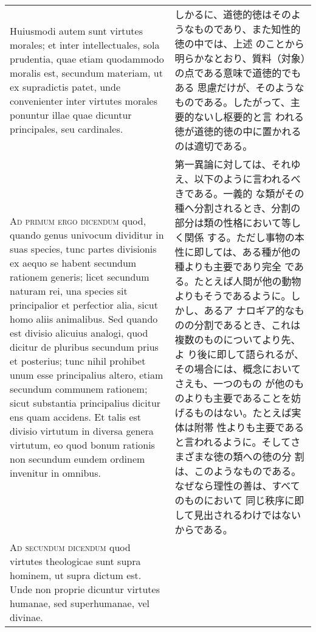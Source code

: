 \documentclass[10pt]{jsarticle}
\begin{document}
\begin{longtable}{p{21em}p{21em}}
 \\

 Huiusmodi
 autem sunt virtutes morales; et inter intellectuales, sola prudentia,
 quae etiam quodammodo moralis est, secundum materiam, ut ex
 supradictis patet, unde convenienter inter virtutes morales ponuntur
 illae quae dicuntur principales, seu cardinales.

 &

 しかるに、道徳的徳はそのようなものであり、また知性的徳の中では、上述
 のことから明らかなとおり、質料（対象）の点である意味で道徳的でもある
 思慮だけが、そのようなものである。したがって、主要的ないし枢要的と言
 われる徳が道徳的徳の中に置かれるのは適切である。

 
\\



{\scshape Ad primum ergo dicendum} quod, quando genus univocum
dividitur in suas species, tunc partes divisionis ex aequo se habent
secundum rationem generis; licet secundum naturam rei, una species sit
principalior et perfectior alia, sicut homo aliis animalibus. Sed
quando est divisio alicuius analogi, quod dicitur de pluribus secundum
prius et posterius; tunc nihil prohibet unum esse principalius altero,
etiam secundum communem rationem; sicut substantia principalius
dicitur ens quam accidens. Et talis est divisio virtutum in diversa
genera virtutum, eo quod bonum rationis non secundum eundem ordinem
invenitur in omnibus.


&

 第一異論に対しては、それゆえ、以下のように言われるべきである。一義的
 な類がその種へ分割されるとき、分割の部分は類の性格において等しく関係
 する。ただし事物の本性に即しては、ある種が他の種よりも主要であり完全
 である。たとえば人間が他の動物よりもそうであるように。しかし、あるア
 ナロギア的なものの分割であるとき、これは複数のものについてより先、よ
 り後に即して語られるが、その場合には、概念においてさえも、一つのもの
 が他のものよりも主要であることを妨げるものはない。たとえば実体は附帯
 性よりも主要であると言われるように。そしてさまざまな徳の類への徳の分
 割は、このようなものである。なぜなら理性の善は、すべてのものにおいて
 同じ秩序に即して見出されるわけではないからである。
 
\\



{\scshape Ad secundum dicendum} quod virtutes theologicae sunt supra
hominem, ut supra dictum est. Unde non proprie dicuntur virtutes
humanae, sed superhumanae, vel divinae.


\end{longtable}
\end{document}

